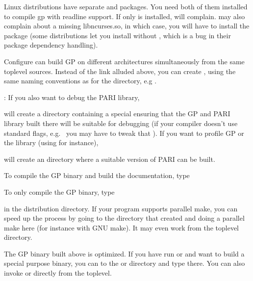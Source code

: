  Linux distributions have separate  and
 packages. You need both of them installed to compile gp
with readline support. If only  is installed, 
will complain.  may also complain about a missing
libncurses.so, in which case, you will have to install the
 package (some distributions let you install
 without , which is a bug in their
package dependency handling).

 Configure can build GP on different architectures
simultaneously from the same toplevel sources. Instead of the 
link alluded above, you can create ,
using the same naming conventions as for the  directory,
e.g .

: If you also want to debug the PARI library,


\noindent will create a directory  containing a special
 ensuring that the GP and PARI library built there will be
suitable for debugging (if your compiler doesn't use standard flags,
e.g.~ you may have to tweak that ). If you want to
profile GP or the library (using  for instance), 


\noindent will create an  directory where a suitable version
of PARI can be built.

 To compile the GP binary and build the
documentation, type


\noindent To only compile the GP binary, type


\noindent in the distribution directory. If your  program supports
parallel make, you can speed up the process by going to the 
directory that  created and doing a parallel make here (for
instance  with GNU make). It may even work from the toplevel
directory.

The GP binary built above is optimized. If you have run  or
 and want to build a special purpose binary, you can  to the
 or  directory and type  there. You can also
invoke  or  directly from the toplevel.

